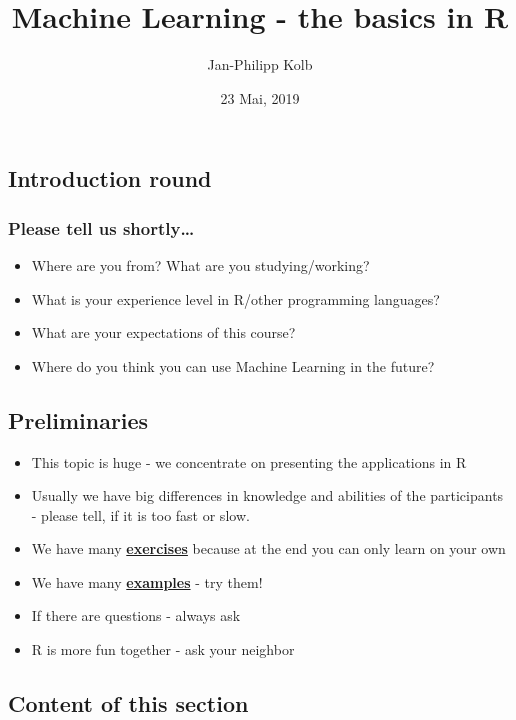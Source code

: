 \documentclass[10pt,]{article}
\title{Machine Learning - the basics in R}
\author{Jan-Philipp Kolb}
\date{23 Mai, 2019}
\providecommand{\tightlist}{%
  \setlength{\itemsep}{0pt}\setlength{\parskip}{0pt}}
\begin{document}
\maketitle

{
\setcounter{tocdepth}{2}
\tableofcontents
}
\subsection{Introduction round}\label{introduction-round}

\subsubsection{Please tell us
shortly\ldots{}}\label{please-tell-us-shortly}

\begin{itemize}
\tightlist
\item
  Where are you from? What are you studying/working?
\item
  What is your experience level in R/other programming languages?
\item
  What are your expectations of this course?
\item
  Where do you think you can use Machine Learning in the future?
\end{itemize}

\subsection{Preliminaries}\label{preliminaries}

\begin{itemize}
\tightlist
\item
  This topic is huge - we concentrate on presenting the applications in
  R
\item
  Usually we have big differences in knowledge and abilities of the
  participants - please tell, if it is too fast or slow.
\item
  We have many
  \href{http://web.math.ku.dk/~helle/R-intro/exercises.pdf}{\textbf{exercises}}
  because at the end you can only learn on your own
\item
  We have many \href{https://www.showmeshiny.com/}{\textbf{examples}} -
  try them!
\item
  If there are questions - always ask
\item
  R is more fun together - ask your neighbor
\end{itemize}

\subsection{Content of this section}\label{content-of-this-section}
\end{document}

